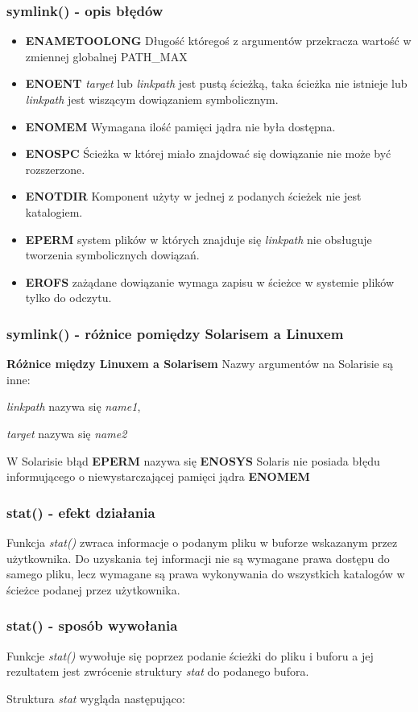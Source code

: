 \documentclass{beamer}
\begin{document}
\begin{frame}
	\frametitle{symlink() - opis błędów}
\begin{itemize}
\item \textbf{ENAMETOOLONG} Długość któregoś z argumentów 
przekracza wartość w zmiennej globalnej PATH\_MAX
\item \textbf{ENOENT}  \textit{target} lub \textit{linkpath} jest pustą ścieżką, taka ścieżka nie istnieje lub \textit{linkpath} jest wiszącym dowiązaniem symbolicznym. 
\item \textbf{ENOMEM}  Wymagana ilość pamięci jądra nie była dostępna.
\item \textbf{ENOSPC}  Ścieżka w której miało znajdować się dowiązanie nie może być rozszerzone.
\item \textbf{ENOTDIR}  Komponent użyty w jednej z podanych ścieżek nie jest katalogiem.
\item \textbf{EPERM} system plików w których znajduje się \textit{linkpath} nie obsługuje tworzenia symbolicznych dowiązań.
\item \textbf{EROFS} zażądane dowiązanie wymaga zapisu w ścieżce w systemie plików tylko do odczytu.
\end{itemize}
\end{frame}

\begin{frame}
	\frametitle{symlink() - różnice pomiędzy Solarisem a Linuxem}
\textbf{Różnice między Linuxem a Solarisem}
Nazwy argumentów na Solarisie są inne:

\textit{linkpath} nazywa się \textit{name1},

\textit{target} nazywa się \textit{name2}

W Solarisie  błąd \textbf{EPERM} nazywa się \textbf{ENOSYS}
Solaris nie posiada błędu informującego o niewystarczającej pamięci jądra \textbf{ENOMEM}
\end{frame}

\begin{frame}
	\frametitle{stat() - efekt działania}
Funkcja\textit{ stat()} zwraca informacje o podanym pliku w buforze wskazanym przez użytkownika. 
Do uzyskania tej informacji nie są wymagane prawa dostępu do samego pliku, lecz wymagane są prawa wykonywania do wszystkich katalogów w ścieżce podanej przez użytkownika. 
\end{frame}

\begin{frame}
	\frametitle{stat() - sposób wywołania}
Funkcje\textit{ stat()} wywołuje się poprzez podanie ścieżki do pliku i buforu a jej rezultatem jest zwrócenie struktury \textit{stat} do podanego bufora. 

Struktura \textit{stat} wygląda następująco:
\end{frame}
\end{document}
